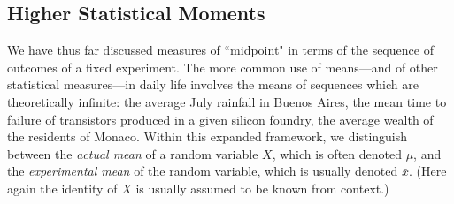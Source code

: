 \subsection{Higher Statistical Moments}
\label{sec:mean-plus-moments}


We have thus far discussed measures of ``midpoint" in terms of the sequence of outcomes of a fixed experiment.  The more common use of means---and of other statistical measures---in daily life involves the means of sequences which are theoretically infinite: the average July rainfall in Buenos Aires, the mean time to failure of transistors produced in a given silicon foundry, the average wealth of the residents of Monaco.  Within this expanded framework, we distinguish between the {\em actual mean} of a random variable $X$, which is often denoted $\mu$, and the {\em experimental mean} of the random variable, which is usually denoted $\bar{x}$.  (Here again the identity of $X$ is usually assumed to be known from context.)

 

\smallskip

